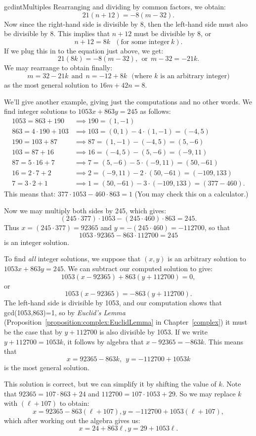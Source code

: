 \begin{example}{gcdintMultiples}
Rearranging and dividing by common factors, we obtain:
\[ 21(n+12) = -8(m-32).\]
Now since the right-hand side is divisible by 8, then the left-hand side must also be divisible by 8.  This implies that $n+12$ must be divisible by 8, or 
\[ n+12 = 8k~~~(\text{for some integer}~k). \]
If we plug this in to the equation just above, we get:
\[ 21(8k) = -8(m-32),~~\text{or}~~m-32 = -21k .\]
We may rearrange to obtain finally:
\[ m = 32 - 21k ~~\text{and}~~ n = -12 + 8k~~~(\text{where }k \text{  is an arbitrary integer)} \]
as the most general solution to  $16m + 42n = 8$.
\end {example}

\begin{example}{}
We'll give another example, giving just the computations and no other words. We find integer solutions to $1053x + 863y =245$ as follows:
\begin{align*}
1053 = 863 + 190 &\implies 190 = (1,-1)\\
863 = 4 \cdot 190 +103 & \implies 103 = (0,1) - 4\cdot (1,-1) = (-4,5)\\
190 = 103 + 87 &\implies 87 = (1,-1) - (-4,5) = (5,-6)\\
103 = 87  + 16 &\implies 16 = (-4,5) - (5,-6) = (-9,11)\\
87 = 5 \cdot 16 + 7 &\implies 7 = (5,-6) - 5\cdot (-9,11) = (50,-61)\\
16 = 2 \cdot 7 + 2 &\implies 2 = (-9,11) - 2 \cdot(50,-61) = (-109,133)\\
7 = 3 \cdot 2 + 1 &\implies 1 = (50,-61) - 3 \cdot(-109,133) = (377 -460).
\end{align*}
This means that:  $377 \cdot 1053  - 460 \cdot 863 = 1$  (You may check this on a calculator.)  

\noindent
Now we may multiply both sides by 245, which gives:  
$$(245 \cdot 377)\cdot 1053 - (245 \cdot 460)\cdot 863 = 245.$$
Thus $x=(245 \cdot 377) =92365$ and $y=- (245 \cdot 460) =-112700$, so that
$$1053 \cdot 92365  - 863 \cdot 112700 = 245$$ 
is an integer solution.

To find \emph{all} integer solutions, we suppose that $(x,y)$ is an arbitrary solution to  $1053x + 863y = 245$. We can  subtract our computed solution to give:
$$1053(x-92365) + 863(y+112700) = 0,$$
or
$$1053(x-92365) = -863(y+112700).$$
The left-hand side is divisible by 1053, and our computation shows that gcd(1053,863)=1, so by \emph{Euclid's Lemma} (Proposition~\ref{proposition:complex:EuclidLemma} in Chapter~\ref{complex}) it must be the case that by $y + 112700$ is also divisible by 1053.  If we write $y + 112700 = 1053k$, it follows by algebra that $x - 92365 = -863k$. This means that 
$$ x = 92365 - 863k,~~ y = -112700 + 1053k$$
is the most general solution.  

This solution is correct, but we can simplify it by shifting the value of $k$.  Note that $92365 = 107 \cdot 863 + 24$ and $112700 = 107 \cdot 1053 + 29$.  So we may replace $k$ with $(\ell + 107)$ to obtain:
$$ x = 92365 - 863(\ell + 107), y = -112700 + 1053(\ell + 107),$$
which after working out the algebra gives us:
$$ x = 24 + 863 \ell, y = 29 + 1053 \ell.$$
\end{example}
 
